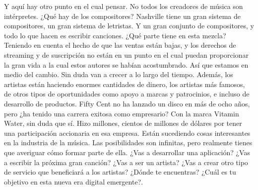 \documentclass[10pt]{book}
\begin{document}
Y aquí hay otro punto en el cual pensar. No todos los creadores de música son intérpretes. ¿Qué hay de los compositores? Nashville tiene un gran sistema de compositores, un gran sistema de letristas. Y un gran conjunto de compositores, y todo lo que hacen es escribir canciones. ¿Qué parte tiene en esta mezcla? Teniendo en cuenta el hecho de que las ventas están bajas, y los derechos de streaming y de suscripción no están en un punto en el cual puedan proporcionar la gran vida a la cual estos autores se habían acostumbrado. Así que estamos en medio del cambio. Sin duda van a crecer a lo largo del tiempo. Además, los artistas están haciendo enormes cantidades de dinero, los artistas más famosos, de otros tipos de oportunidades como apoyo a marcas y patrocinios, e incluso de desarrollo de productos. Fifty Cent no ha lanzado un disco  en más de ocho años, pero ¿ha tenido una carrera exitosa como empresario? Con la marca Vitamin Water, sin duda que sí. Hizo millones, cientos de millones de dólares por tener una participación accionaria en esa empresa. Están sucediendo cosas interesantes  en la industria de la música. Las posibilidades son infinitas, pero realmente tienes que averiguar  cómo formar parte de ella. ¿Vas a desarrollar una aplicación? ¿Vas a escribir la próxima gran canción? ¿Vas a ser un artista? ¿Vas a crear otro tipo de servicio que beneficiará a los artistas? ¿Dónde te encuentras? ¿Cuál es tu objetivo en esta nueva era digital emergente?.
\end{document}
